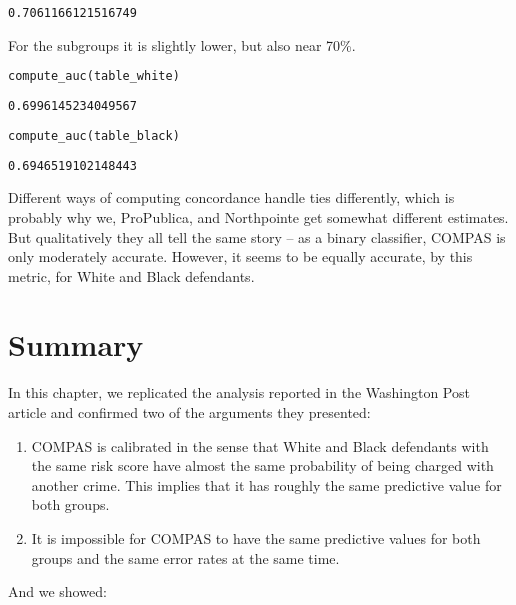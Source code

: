 \begin{lstlisting}[style=output]
0.7061166121516749
\end{lstlisting}

For the subgroups it is slightly lower, but also near 70\%.

\begin{lstlisting}[language=Python,style=source]
compute_auc(table_white)
\end{lstlisting}

\begin{lstlisting}[style=output]
0.6996145234049567
\end{lstlisting}

\begin{lstlisting}[language=Python,style=source]
compute_auc(table_black)
\end{lstlisting}

\begin{lstlisting}[style=output]
0.6946519102148443
\end{lstlisting}

Different ways of computing concordance handle ties differently, which
is probably why we, ProPublica, and Northpointe get somewhat different
estimates. But qualitatively they all tell the same story -- as a binary
classifier, COMPAS is only moderately accurate. However, it seems to be
equally accurate, by this metric, for White and Black defendants.

\section{Summary}\label{summary}

In this chapter, we replicated the analysis reported in the Washington
Post article and confirmed two of the arguments they presented:

\begin{enumerate}
\def\labelenumi{\arabic{enumi}.}
\item
  COMPAS is calibrated in the sense that White and Black defendants with
  the same risk score have almost the same probability of being charged
  with another crime. This implies that it has roughly the same
  predictive value for both groups.
\item
  It is impossible for COMPAS to have the same predictive values for
  both groups and the same error rates at the same time.
\end{enumerate}

And we showed:

